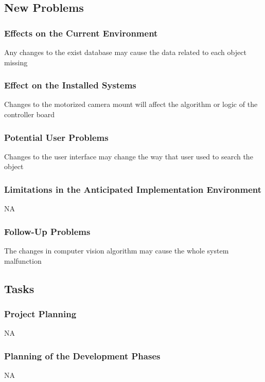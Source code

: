 \documentclass[12pt]{article}
\begin{document}
\subsection{New Problems}
    \subsubsection{Effects on the Current Environment}
       \hspace{0.5cm} Any changes to the exist database may cause the data related to each object missing
    \subsubsection{Effect on the Installed Systems}
        \hspace{0.5cm} Changes to the motorized camera mount will affect the algorithm or logic of the controller board
    \subsubsection{Potential User Problems}
        \hspace{0.5cm} Changes to the user interface may change the way that user used to search the object
    
    \subsubsection{Limitations in the Anticipated Implementation Environment}
        \hspace{0.5cm}NA
    \subsubsection{Follow-Up Problems}
        \hspace{0.5cm} The changes in computer vision algorithm may cause the whole system malfunction

\subsection{Tasks}
    \subsubsection{Project Planning}
    NA
    
    \subsubsection{Planning of the Development Phases}
    NA
\end{document}
